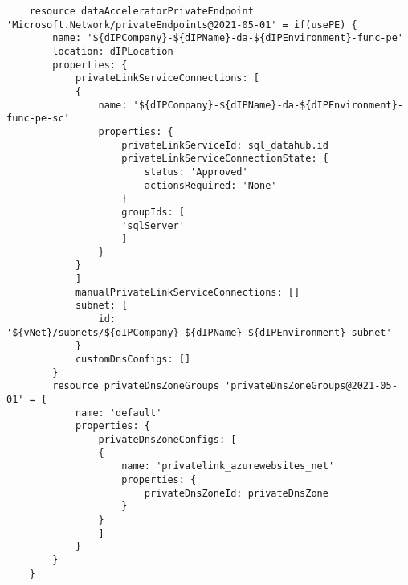 \documentclass[dutch,dit,thesis]{hogentreport}
\begin{document}
\begin{lstlisting}
    resource dataAcceleratorPrivateEndpoint 'Microsoft.Network/privateEndpoints@2021-05-01' = if(usePE) {
        name: '${dIPCompany}-${dIPName}-da-${dIPEnvironment}-func-pe'
        location: dIPLocation
        properties: {
            privateLinkServiceConnections: [
            {
                name: '${dIPCompany}-${dIPName}-da-${dIPEnvironment}-func-pe-sc'
                properties: {
                    privateLinkServiceId: sql_datahub.id
                    privateLinkServiceConnectionState: {
                        status: 'Approved'
                        actionsRequired: 'None'
                    }
                    groupIds: [
                    'sqlServer'
                    ]
                }
            }
            ]
            manualPrivateLinkServiceConnections: []
            subnet: {
                id: '${vNet}/subnets/${dIPCompany}-${dIPName}-${dIPEnvironment}-subnet'
            }
            customDnsConfigs: []
        }
        resource privateDnsZoneGroups 'privateDnsZoneGroups@2021-05-01' = {
            name: 'default'
            properties: {
                privateDnsZoneConfigs: [
                {
                    name: 'privatelink_azurewebsites_net'
                    properties: {
                        privateDnsZoneId: privateDnsZone
                    }
                }
                ]
            }
        }
    }
\end{lstlisting}
\end{document}
